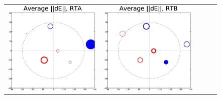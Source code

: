 \documentclass[]{aa}
\begin{document}
\begin{figure}
\begin{tabular}{@{}c@{}c@{}c@{}c@{}c@{}}
\includegraphics[width=\roguewidth]{o2006_dE_antA} &
\includegraphics[width=\roguewidth]{o2006_dE_antB} &

\end{tabular}
\end{figure}
\end{document}
